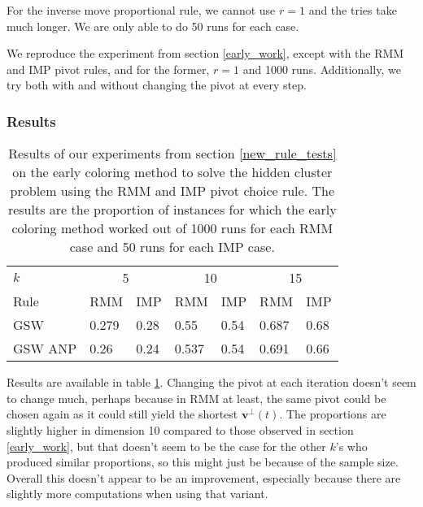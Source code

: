 \documentclass[12pt]{article}
\begin{document}
For the inverse move proportional rule, we cannot use $r=1$ and the tries take much longer. We are only able to do 50 runs for each case.

We reproduce the experiment from section \ref{early_work}, except with the RMM and IMP pivot rules, and for the former, $r=1$ and 1000 runs. Additionally, we try both with and without changing the pivot at every step.

\subsubsection{Results}
\begin{table}[h!]
\centering
\caption{Results of our experiments from section \ref{new_rule_tests} on the early coloring method to solve the hidden cluster problem using the RMM and IMP pivot choice rule. The results are the proportion of instances for which the early coloring method worked out of 1000 runs for each RMM case and 50 runs for each IMP case.}
\begin{tabular}{l|ll|ll|ll}
$k$  & \multicolumn{2}{c}{5} & \multicolumn{2}{c}{10} & \multicolumn{2}{c}{15}\\
Rule &RMM&IMP&RMM&IMP&RMM&IMP\\ \hline
GSW  &0.279&0.28&0.55&0.54&0.687&0.68\\
GSW ANP&0.26&0.24&0.537&0.54&0.691&0.66
\end{tabular}
\label{early_coloring_method_exp2}
\end{table}
Results are available in table \ref{early_coloring_method_exp2}. Changing the pivot at each iteration doesn't seem to change much, perhaps because in RMM at least, the same pivot could be chosen again as it could still yield the shortest $\textbf{v}^\perp(t)$. The proportions are slightly higher in dimension 10 compared to those observed in section \ref{early_work}, but that doesn't seem to be the case for the other $k$'s who produced similar proportions, so this might just be because of the sample size. Overall this doesn't appear to be an improvement, especially because there are slightly more computations when using that variant.

 
\end{document}
